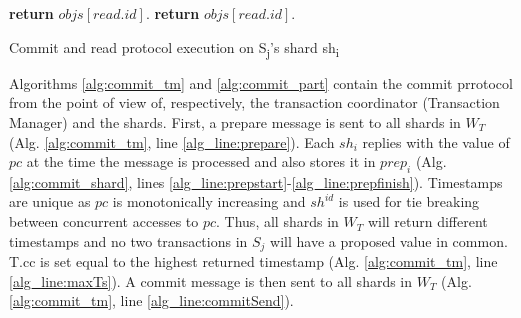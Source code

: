 \documentclass{vldb}
\begin{document}
\begin{algorithm}
\begin{algorithmic}[1]
				\State \textbf{return} 	$\mathit{objs[read.id]}$.
			\EndIf
			\State \textbf{return} $\mathit{objs[read.id]}$.
		\EndFunction
	\end{algorithmic}
	\caption{Commit and read protocol execution on S\textsubscript{j}'s shard sh\textsubscript{i}}
	\label{alg:commit_shard}
\end{algorithm}

Algorithms \ref{alg:commit_tm} and \ref{alg:commit_part} contain the commit prrotocol from the point of view of, respectively, the transaction coordinator (Transaction Manager) and the shards.
First, a prepare message is sent to all shards in $W_T$ (Alg. \ref{alg:commit_tm}, line \ref{alg_line:prepare}).
Each $\mathit{sh}_i$ replies with the value of $\mathit{pc}$ at the time the message is processed and also stores it in $\mathit{prep}_i$ (Alg. \ref{alg:commit_shard}, lines \ref{alg_line:prepstart}-\ref{alg_line:prepfinish}).
Timestamps are unique as $\mathit{pc}$ is monotonically increasing and $\mathit{sh^{id}}$ is used for tie breaking between concurrent accesses to $\mathit{pc}$.
Thus, all shards in $W_T$ will return different timestamps and no two transactions in $S_j$ will have a proposed value in common.
T.cc is set equal to the highest returned timestamp (Alg. \ref{alg:commit_tm}, line \ref{alg_line:maxTs}).
A commit message is then sent to all shards in $W_T$ (Alg. \ref{alg:commit_tm}, line \ref{alg_line:commitSend}).
\end{document}
